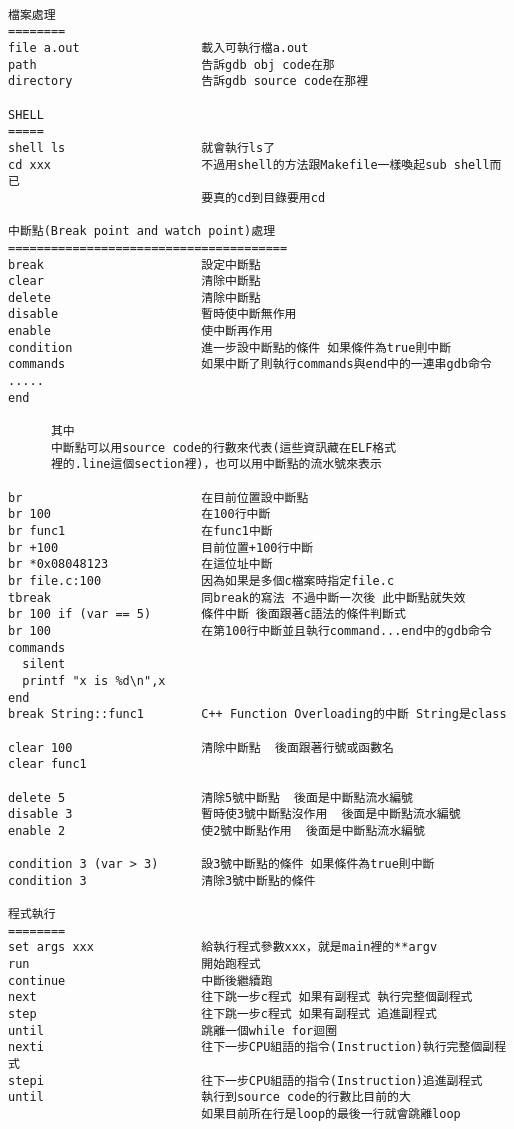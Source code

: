   \begin{verbatim}
      
檔案處理
========
file a.out                 載入可執行檔a.out
path                       告訴gdb obj code在那
directory                  告訴gdb source code在那裡

SHELL
=====
shell ls                   就會執行ls了
cd xxx                     不過用shell的方法跟Makefile一樣喚起sub shell而已
                           要真的cd到目錄要用cd

中斷點(Break point and watch point)處理
=======================================
break                      設定中斷點 
clear                      清除中斷點
delete                     清除中斷點
disable                    暫時使中斷無作用
enable                     使中斷再作用
condition                  進一步設中斷點的條件 如果條件為true則中斷
commands                   如果中斷了則執行commands與end中的一連串gdb命令
.....
end
      
      其中
      中斷點可以用source code的行數來代表(這些資訊藏在ELF格式
      裡的.line這個section裡)，也可以用中斷點的流水號來表示
      
br                         在目前位置設中斷點
br 100                     在100行中斷
br func1                   在func1中斷
br +100                    目前位置+100行中斷
br *0x08048123             在這位址中斷
br file.c:100              因為如果是多個c檔案時指定file.c
tbreak                     同break的寫法 不過中斷一次後 此中斷點就失效
br 100 if (var == 5)       條件中斷 後面跟著c語法的條件判斷式
br 100                     在第100行中斷並且執行command...end中的gdb命令
commands
  silent
  printf "x is %d\n",x
end
break String::func1        C++ Function Overloading的中斷 String是class

clear 100                  清除中斷點  後面跟著行號或函數名
clear func1

delete 5                   清除5號中斷點  後面是中斷點流水編號
disable 3                  暫時使3號中斷點沒作用  後面是中斷點流水編號
enable 2                   使2號中斷點作用  後面是中斷點流水編號

condition 3 (var > 3)      設3號中斷點的條件 如果條件為true則中斷
condition 3                清除3號中斷點的條件

程式執行
========
set args xxx               給執行程式參數xxx，就是main裡的**argv            
run                        開始跑程式
continue                   中斷後繼續跑
next                       往下跳一步c程式 如果有副程式 執行完整個副程式
step                       往下跳一步c程式 如果有副程式 追進副程式
until                      跳離一個while for迴圈
nexti                      往下一步CPU組語的指令(Instruction)執行完整個副程式
stepi                      往下一步CPU組語的指令(Instruction)追進副程式
until                      執行到source code的行數比目前的大
                           如果目前所在行是loop的最後一行就會跳離loop


\end{verbatim}
